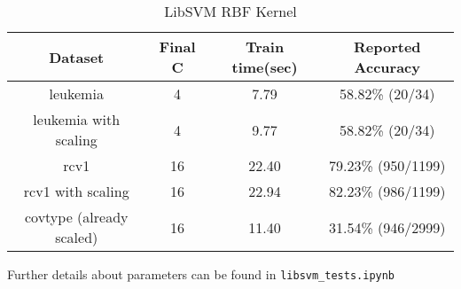 \documentclass{article}
\begin{document}
\begin{table}
    \begin{tabular}{|c|c|c|c|}
    \hline
    \textbf{Dataset}                  & \textbf{Final C}  &\textbf{Train time(sec)}       & \textbf{Reported Accuracy}       \\ \hline
    leukemia                 & 4     & 7.79 & 58.82\% (20/34)         \\ \hline
    leukemia with scaling    & 4      & 9.77 & 58.82\% (20/34)        \\ \hline
    rcv1                     & 16        & 22.40 &  79.23\% (950/1199) \\ \hline
    rcv1 with scaling        & 16   & 22.94 & 82.23\% (986/1199) \\ \hline
    covtype (already scaled) & 16 & 11.40 & 31.54\% (946/2999)  \\ \hline
    \end{tabular}
    \caption{LibSVM RBF Kernel}
\end{table}

Further details about parameters can be found in \verb|libsvm_tests.ipynb|
\end{document}

